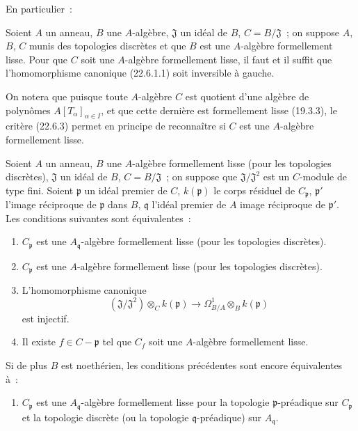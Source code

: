 En particulier~:

\begin{corollary}[22.6.3]
\label{0.22.6.3-fr}
Soient $A$ un anneau, $B$ une $A$-algèbre, $\mathfrak J$ un idéal de $B$,
$C=B/\mathfrak J$~; on suppose $A$, $B$, $C$ munis des topologies discrètes
et que $B$ est une $A$-algèbre formellement lisse. Pour que $C$ soit une
$A$-algèbre formellement lisse, il faut et il suffit que l'homomorphisme
canonique (22.6.1.1) soit inversible à gauche.
\end{corollary}

On notera que puisque toute $A$-algèbre $C$ est quotient d'une algèbre de
polynômes $A[T_\alpha]_{\alpha\in I}$, et que cette dernière est formellement
lisse (19.3.3), le critère (22.6.3) permet en principe de reconnaître si $C$
est une $A$-algèbre formellement lisse.

\begin{proposition}[22.6.4]
\label{0.22.6.4-fr}
Soient $A$ un anneau, $B$ une $A$-algèbre formellement lisse (pour les
topologies discrètes), $\mathfrak J$ un idéal de $B$, $C=B/\mathfrak J$~; on
suppose que $\mathfrak J/\mathfrak J^2$ est un $C$-module de type fini. Soient
$\mathfrak p$ un idéal premier de $C$, $k(\mathfrak p)$ le corps résiduel de
$C_{\mathfrak p}$, $\mathfrak p'$ l'image réciproque de $\mathfrak p$ dans
$B$, $\mathfrak q$ l'idéal premier de $A$ image réciproque de $\mathfrak p'$.
Les conditions suivantes sont équivalentes~:
\begin{enumerate}
  \item[a)] $C_{\mathfrak p}$ est une $A_{\mathfrak q}$-algèbre formellement
  lisse (pour les topologies discrètes).
  \item[a')] $C_{\mathfrak p}$ est une $A$-algèbre formellement lisse (pour
  les topologies discrètes).
  \item[b)] L'homomorphisme canonique
  \begin{equation}
  \label{0.22.6.4.1-fr}
    (\mathfrak J/\mathfrak J^2)\otimes_Ck(\mathfrak p)
    \longrightarrow\Omega^1_{B/A}\otimes_Bk(\mathfrak p)
    \tag{22.6.4.1}
  \end{equation}
  est injectif.
  \item[c)] Il existe $f\in C-\mathfrak p$ tel que $C_f$ soit une
  $A$-algèbre formellement lisse.
\end{enumerate}
Si de plus $B$ est noethérien, les conditions précédentes sont encore
équivalentes à~:
\begin{enumerate}
  \item[d)] $C_{\mathfrak p}$ est une $A_{\mathfrak q}$-algèbre formellement
  lisse pour la topologie $\mathfrak p$-préadique sur $C_{\mathfrak p}$ et la
  topologie discrète (ou la topologie $\mathfrak q$-préadique) sur
  $A_{\mathfrak q}$.
\end{enumerate}
\end{proposition}

